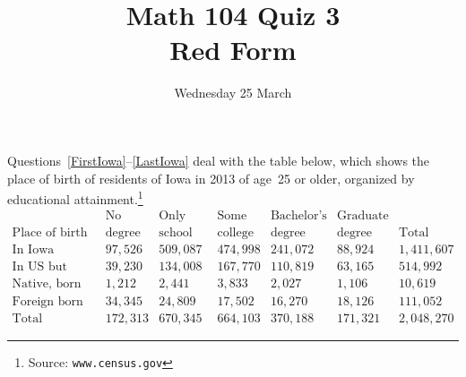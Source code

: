 \documentclass[answers,12pt]{exam}
\title{Math 104 Quiz 3\\Red Form}
\date{Wednesday 25 March}
\begin{document}
\maketitle
\begin{center}
\end{center}

Questions~\ref{FirstIowa}--\ref{LastIowa} deal with
the table below, which shows the place of birth of 
residents of Iowa 
in 2013 of age~25 or older,
organized by educational
attainment.\footnote{
Source: \tt www.census.gov}
\[\begin{array}{r|rrrrr|r}

&\text{No}&\text{Only high}&\text{Some}&\text{Bachelor's}&\text{Graduate}\\
\text{Place of birth}&\text{degree}
&\text{school}&\text{college}&\text{degree}&\text{degree}&\text{Total}
\\\hline
\text{In Iowa}
&97,526&509,087&474,998&241,072&88,924&1,411,607\\
\text{In US but outside Iowa}
&39,230&134,008&167,770&110,819&63,165&514,992\\
\text{Native, born outside US}
&1,212&2,441&3,833&2,027&1,106&10,619\\
\text{Foreign born}
&34,345&24,809&17,502&16,270&18,126&111,052\\\hline
\text{Total}
&172,313&670,345&664,103&370,188&171,321&2,048,270
\end{array}\]
\end{document}
